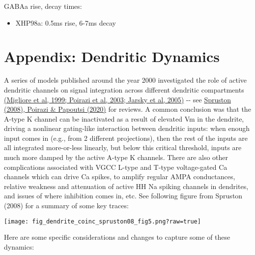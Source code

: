 \documentclass[11pt,twoside]{article}
\newif\myifpdf
\begin{document}
GABAa rise, decay times:

\begin{itemize}
\tightlist
\item
  XHP98a: 0.5ms rise, 6-7ms decay
\end{itemize}

\hypertarget{appendix-dendritic-dynamics}{%
\section{Appendix: Dendritic
Dynamics}\label{appendix-dendritic-dynamics}}

A series of models published around the year 2000 investigated the role
of active dendritic channels on signal integration across different
dendritic compartments \protect\hyperlink{references}{(Migliore et al,
1999; Poirazi et al, 2003; Jarsky et al, 2005)} -\/- see
\protect\hyperlink{references}{Spruston (2008), Poirazi \& Papoutsi
(2020)} for reviews. A common conclusion was that the A-type K channel
can be inactivated as a result of elevated Vm in the dendrite, driving a
nonlinear gating-like interaction between dendritic inputs: when enough
input comes in (e.g., from 2 different projections), then the rest of
the inputs are all integrated more-or-less linearly, but below this
critical threshold, inputs are much more damped by the active A-type K
channels. There are also other complications associated with VGCC L-type
and T-type voltage-gated Ca channels which can drive Ca spikes, to
amplify regular AMPA conductances, relative weakness and attenuation of
active HH Na spiking channels in dendrites, and issues of where
inhibition comes in, etc. See following figure from Spruston (2008) for
a summary of some key traces:

\texttt{[image: fig\_dendrite\_coinc\_spruston08\_fig5.png?raw=true]}

Here are some specific considerations and changes to capture some of
these dynamics:
\end{document}
